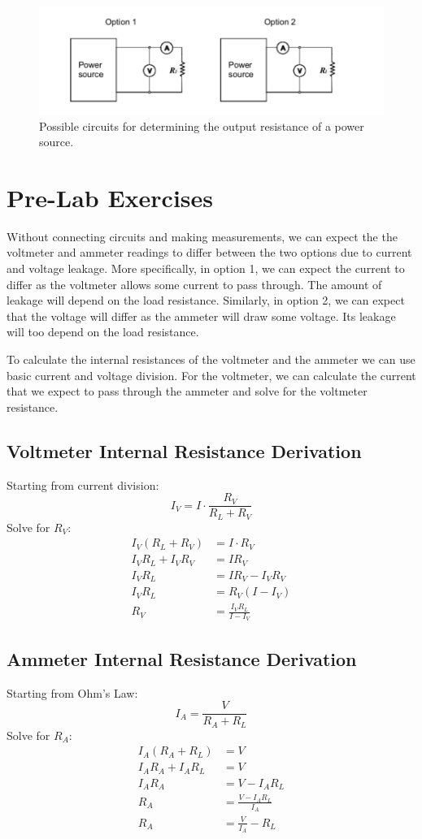 \documentclass{article} %
\begin{document}
\begin{figure}[htbp]            %
  \centering
  \includegraphics[width=0.65\linewidth]{Figs/two_circuits.png}
  \caption{Possible circuits for determining the output resistance of a power source.}
  \label{fig:two_circuits}
\end{figure}

\section{Pre-Lab Exercises}

Without connecting circuits and making measurements, we can expect the the voltmeter and ammeter readings to differ between the two options due to current and voltage leakage.
More specifically, in option 1, we can expect the current to differ as the voltmeter allows some current to pass through. The amount of leakage will depend on the load resistance.
Similarly, in option 2, we can expect that the voltage will differ as the ammeter will draw some voltage. Its leakage will too depend on the load resistance.

To calculate the internal resistances of the voltmeter and the ammeter we can use basic current and voltage division.
For the voltmeter, we can calculate the current that we expect to pass through the ammeter and solve for the voltmeter resistance.

\subsection{Voltmeter Internal Resistance Derivation}
Starting from current division:
\[
I_V = I \cdot \frac{R_V}{R_L + R_V}
\]
Solve for $R_V$:
\begin{align*}
I_V (R_L + R_V) &= I \cdot R_V \\
I_V R_L + I_V R_V &= I R_V \\
I_V R_L &= I R_V - I_V R_V \\
I_V R_L &= R_V (I - I_V) \\
R_V &= \frac{I_V R_L}{I - I_V}
\end{align*}

\subsection{Ammeter Internal Resistance Derivation}
Starting from Ohm's Law:
\[
I_A = \frac{V}{R_A + R_L}
\]
Solve for $R_A$:
\begin{align*}
I_A (R_A + R_L) &= V \\
I_A R_A + I_A R_L &= V \\
I_A R_A &= V - I_A R_L \\
R_A &= \frac{V - I_A R_L}{I_A} \\
R_A &= \frac{V}{I_A} - R_L
\end{align*}
\end{document}
